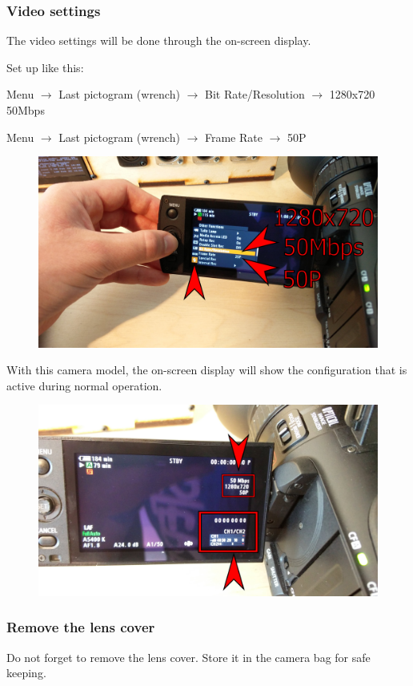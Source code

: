 \documentclass{article}
\begin{document}
\subsubsection{Video settings}
The video settings will be done through the on-screen display.

Set up like this:

Menu $\rightarrow$ Last pictogram (wrench) $\rightarrow$ Bit Rate/Resolution $\rightarrow$ 1280x720 50Mbps

Menu $\rightarrow$ Last pictogram (wrench) $\rightarrow$ Frame Rate $\rightarrow$ 50P

\begin{figure}[H]
  \centering
\includegraphics[width = 120mm]{Canon05.jpg}
\end{figure}

With this camera model, the on-screen display will show the configuration that is active during normal operation.
\begin{figure}[H]
  \centering
\includegraphics[width = 120mm]{Canon06.jpg}
\end{figure}

\subsubsection{Remove the lens cover}
Do not forget to remove the lens cover. Store it in the camera bag for safe keeping.
\end{document}
